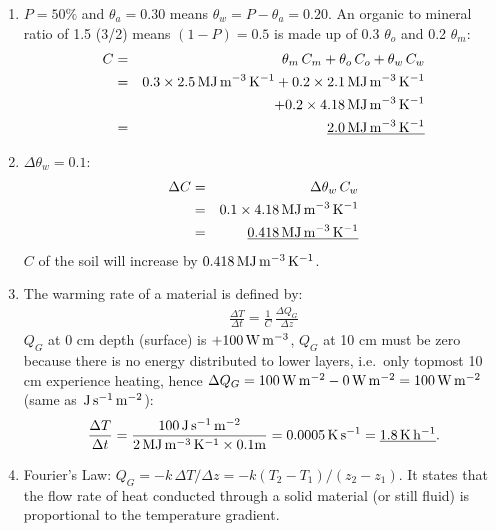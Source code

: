 \documentclass[11pt]{article}
\begin{document}
\begin{enumerate}
\item $P = 50\%$ and $\theta_a = 0.30$ means $\theta_{w} = P - \theta_a = 0.20$. An organic to mineral ratio of 1.5 (3/2) means $(1-P) = 0.5$ is made up of 0.3 $\theta_{o}$ and 0.2 $\theta_{m}$:
\begin{eqnarray*} 
C &=& \theta_m\,C_m + \theta_o\,C_o + \theta_w\,C_w \\
 &=& 0.3 \times 2.{5}\,\rm{MJ}\,\rm{m}^{-3}\,\rm{K}^{-1} 
 + 0.2 \times 2.{1} \,\rm{MJ}\,\rm{m}^{-3}\,\rm{K}^{-1} \\
 && + 0.2 \times 4.18 \,\rm{MJ}\,\rm{m}^{-3}\,\rm{K}^{-1}  \\
 &=& \underline{{2.0}\,\rm{MJ}\,\rm{m}^{-3}\,\rm{K}^{-1}}
\end{eqnarray*} 

\item $\Delta \theta_w = 0.1$:
\begin{eqnarray*} 
\Delta C &=& \Delta \theta_w\,C_w \\
 &=& 0.1 \times 4.18 \,\rm{MJ}\,\rm{m}^{-3}\,\rm{K}^{-1}  \\
 &=& \underline{0.418\,\rm{MJ}\,\rm{m}^{-3}\,\rm{K}^{-1}}
\end{eqnarray*} 
$C$ of the soil will increase by $0.418\,\rm{MJ}\,\rm{m}^{-3}\,\rm{K}^{-1}$.

\item The warming rate of a material is defined by:
\begin{eqnarray*} 
\frac{\Delta T}{\Delta t} = \frac{1}{C}\, \frac{\Delta Q_G}{\Delta z}
\end{eqnarray*} 
$Q_G$ at 0 cm depth (surface) is $+100\,\rm{W}\,\rm{m}^{-3}$, $Q_G$ at 10 cm must be zero because there is no energy distributed to lower layers, i.e.\ only topmost 10 cm experience heating, hence $\Delta Q_G = 100\,\rm{W}\,\rm{m}^{-2} - 0\,\rm{W}\,\rm{m}^{-2} = 100\,\rm{W}\,\rm{m}^{-2}$ (same as $\,\rm{J}\,\rm{s}^{-1}\,\rm{m}^{-2}$):
\begin{eqnarray*} 
\frac{\Delta T}{\Delta t} = \frac{100\,\rm{J}\,\rm{s}^{-1}\,\rm{m}^{-2}}{2 \,\rm{MJ}\,\rm{m}^{-3}\,\rm{K}^{-1} \times 0.1 \rm{m}} = 0.0005 \,\rm{K}\,\rm{s}^{-1} =  \underline{1.8 \,\rm{K}\,\rm{h}^{-1}}.
\end{eqnarray*} 

\item Fourier's Law: $Q_{G} = -k\,\Delta T/\Delta z = -k(T_{2}-T_{1})/(z_{2}-z_{1})$. It states that the
flow rate of heat conducted through a solid material (or still fluid) is
proportional to the temperature gradient.


\end{enumerate}
\end{document}
